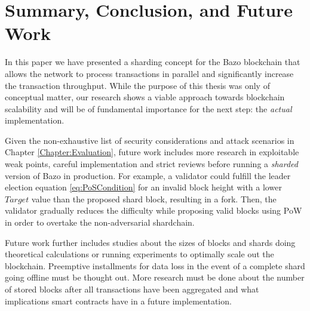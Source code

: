 
\chapter{Summary, Conclusion, and Future Work}
\label{Chapter:Summary}

In this paper we have presented a sharding concept for the Bazo blockchain that allows the network to process transactions in parallel and significantly increase the transaction throughput. While the purpose of this thesis was only of conceptual matter, our research shows a viable approach towards blockchain scalability and will be of fundamental importance for the next step: the \textit{actual} implementation.

Given the non-exhaustive list of security considerations and attack scenarios in Chapter \ref{Chapter:Evaluation}, future work includes more research in exploitable weak points, careful implementation and strict reviews before running a \textit{sharded} version of Bazo in production. For example, a validator could fulfill the leader election equation \ref{eq:PoSCondition} for an invalid block height with a lower $Target$ value than the proposed shard block, resulting in a fork. Then, the validator gradually reduces the difficulty while proposing valid blocks using PoW in order to overtake the non-adversarial shardchain.

Future work further includes studies about the sizes of blocks and shards doing theoretical calculations or running experiments to optimally scale out the blockchain. Preemptive installments for data loss in the event of a complete shard going offline must be thought out. More research must be done about the number of stored blocks after all transactions have been aggregated and what implications smart contracts have in a future implementation.